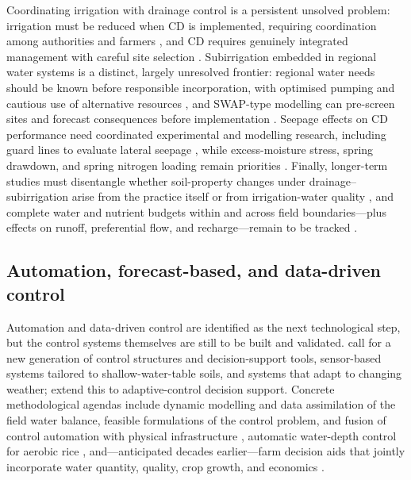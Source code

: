 \documentclass[11pt]{article}
\begin{document}
Coordinating irrigation with drainage control is a persistent unsolved problem:
irrigation must be reduced when CD is implemented, requiring coordination among
authorities and farmers \parencite{Wahba2005,Ritzema2011,Ritzema2016}, and CD
requires genuinely integrated management with careful site selection
\parencite{Dukhovny2018}. Subirrigation embedded in regional water systems is a
distinct, largely unresolved frontier: regional water needs should be known
before responsible incorporation, with optimised pumping and cautious use of
alternative resources \parencite{deWit2022}, and SWAP-type modelling can
pre-screen sites and forecast consequences before implementation
\parencite{deWit2024}. Seepage effects on CD performance need coordinated
experimental and modelling research, including guard lines to evaluate lateral
seepage \parencite{Youssef2021,Pease2017,Ale2009}, while excess-moisture stress,
spring drawdown, and spring nitrogen loading remain priorities
\parencite{Craft2018,Lahdou2019}. Finally, longer-term studies must disentangle
whether soil-property changes under drainage--subirrigation arise from the
practice itself or from irrigation-water quality \parencite{Kaur2023}, and
complete water and nutrient budgets within and across field boundaries---plus
effects on runoff, preferential flow, and recharge---remain to be tracked
\parencite{Shedekar2021,Ross2016,King2022}.

\subsection{Automation, forecast-based, and data-driven control}

Automation and data-driven control are identified as the next technological
step, but the control systems themselves are still to be built and validated.
\textcite{Youssef2023} call for a new generation of control structures and
decision-support tools, sensor-based systems tailored to shallow-water-table
soils, and systems that adapt to changing weather; \textcite{Ayars2015} extend
this to adaptive-control decision support. Concrete methodological agendas
include dynamic modelling and data assimilation of the field water balance,
feasible formulations of the control problem, and fusion of control automation
with physical infrastructure \parencite{Ikonen2023,Isomäki2024}, automatic
water-depth control for aerobic rice \parencite{Arif2021}, and---anticipated
decades earlier---farm decision aids that jointly incorporate water quantity,
quality, crop growth, and economics \parencite{THOMAS1995}.
\end{document}
